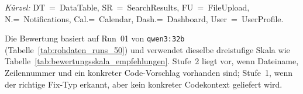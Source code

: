 \clearpage

\label{app:empfehlungsqualitaet_50}

\noindent\textit{Kürzel:} DT~=~DataTable, SR~=~SearchResults, FU~=~FileUpload, N.=~Notifications, Cal.=~Calendar, Dash.=~Dashboard, User~=~UserProfile.

Die Bewertung basiert auf Run~01 von \texttt{qwen3:32b} (Tabelle~\ref{tab:rohdaten_runs_50}) und verwendet dieselbe dreistufige Skala wie Tabelle~\ref{tab:bewertungsskala_empfehlungen}. Stufe~2 liegt vor, wenn Dateiname, Zeilennummer und ein konkreter Code-Vorschlag vorhanden sind; Stufe~1, wenn der richtige Fix-Typ erkannt, aber kein konkreter Codekontext geliefert wird.

\setlength{\tabcolsep}{2.5pt}
\renewcommand{\arraystretch}{1.08}
